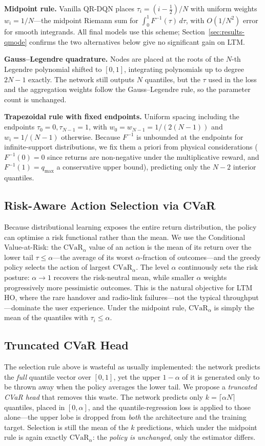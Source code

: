 \documentclass[conference]{IEEEtran}
\begin{document}
\textbf{Midpoint rule.} Vanilla QR-DQN places $\tau_i=(i-\tfrac12)/N$ with
uniform weights $w_i=1/N$---the midpoint Riemann sum for
$\int_0^1 F^{-1}(\tau)\,d\tau$, with $O(1/N^2)$ error for smooth integrands.
All final models use this scheme; Section~\ref{sec:results-qmode} confirms the
two alternatives below give no significant gain on LTM.

\textbf{Gauss--Legendre quadrature.} Nodes are placed at the roots of the
$N$-th Legendre polynomial shifted to $[0,1]$, integrating polynomials up to
degree $2N-1$ exactly. The network still outputs $N$ quantiles, but the
$\tau$ used in the loss and the aggregation weights follow the Gauss--Legendre
rule, so the parameter count is unchanged.

\textbf{Trapezoidal rule with fixed endpoints.} Uniform spacing including the
endpoints $\tau_0=0,\tau_{N-1}=1$, with $w_0=w_{N-1}=1/(2(N-1))$ and
$w_i=1/(N-1)$ otherwise. Because $F^{-1}$ is unbounded at the endpoints for
infinite-support distributions, we fix them a priori from physical
considerations ($F^{-1}(0)=0$ since returns are non-negative under the
multiplicative reward, and $F^{-1}(1)=q_{\max}$ a conservative upper bound),
predicting only the $N-2$ interior quantiles.

\subsection{Risk-Aware Action Selection via CVaR}
\label{sec:cvar}
Because distributional learning exposes the entire return distribution, the
policy can optimise a risk functional rather than the mean. We use the
Conditional Value-at-Risk: the $\mathrm{CVaR}_\alpha$ value of an action is the
mean of its return over the lower tail $\tau\le\alpha$---the average of its worst
$\alpha$-fraction of outcomes---and the greedy policy selects the action of
largest $\mathrm{CVaR}_\alpha$. The level $\alpha$ continuously sets the risk
posture: $\alpha\!\to\!1$ recovers the risk-neutral mean, while smaller $\alpha$
weights progressively more pessimistic outcomes. This is the natural objective
for LTM HO, where the rare handover and radio-link failures---not the typical
throughput---dominate the user experience. Under the midpoint rule,
$\mathrm{CVaR}_\alpha$ is simply the mean of the quantiles with $\tau_i\le\alpha$.

\subsection{Truncated CVaR Head}
\label{sec:trunc-cvar}
The selection rule above is wasteful as usually implemented: the network predicts
the \emph{full} quantile vector over $[0,1]$, yet the upper $1-\alpha$ of it is
generated only to be thrown away when the policy averages the lower tail. We
propose a \emph{truncated CVaR head} that removes this waste. The network predicts
only $k=\lceil\alpha N\rceil$ quantiles, placed in $[0,\alpha]$, and the
quantile-regression loss is applied to those alone---the upper lobe is dropped from
\emph{both} the architecture and the training target. Selection is still the mean
of the $k$ predictions, which under the midpoint rule is again exactly
$\mathrm{CVaR}_\alpha$: the \emph{policy is unchanged}, only the estimator differs.
\end{document}
